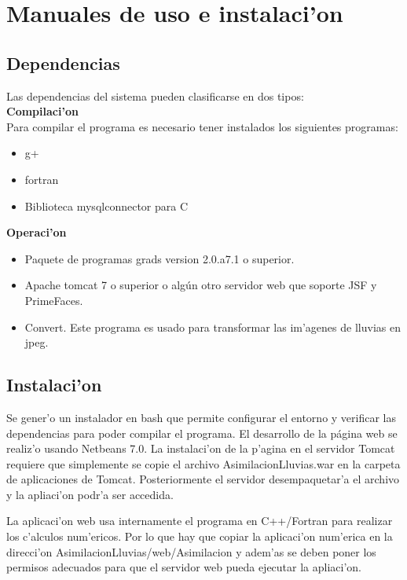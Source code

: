 \chapter{Manuales de uso e instalaci'on}

\section{Dependencias}
Las dependencias del sistema pueden clasificarse en dos tipos:\\
\textbf{Compilaci'on} 
\\
Para compilar el programa es necesario tener instalados los siguientes programas:
\begin{itemize}
 \item g+
  \item fortran
  \item Biblioteca mysqlconnector para C  
\end{itemize}

\textbf{Operaci'on} 

\begin{itemize}
 \item Paquete de programas grads version 2.0.a7.1 o superior.
  \item Apache tomcat 7 o superior o algún otro servidor web que soporte JSF y PrimeFaces.
  \item Convert. Este programa es usado para transformar las im'agenes de lluvias en jpeg.
\end{itemize}

\section{Instalaci'on}
Se gener'o un instalador en bash que permite configurar el entorno y verificar las dependencias para poder compilar
el programa.
El desarrollo de la página web se realiz'o usando Netbeans 7.0. La instalaci'on de la p'agina en el servidor Tomcat requiere que
simplemente se copie el archivo AsimilacionLluvias.war en la carpeta de aplicaciones de Tomcat. Posteriormente el servidor 
desempaquetar'a el archivo y la apliaci'on podr'a ser accedida.

La aplicaci'on web usa internamente el programa en C++/Fortran para realizar los c'alculos num'ericos. Por lo que hay que copiar
la aplicaci'on num'erica en la direcci'on AsimilacionLluvias/web/Asimilacion y adem'as se deben poner los permisos adecuados para
que el servidor web pueda ejecutar la apliaci'on.

